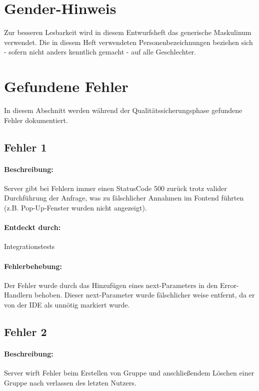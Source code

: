 \documentclass{qualitätssicherungsheft}
\begin{document}

\maketitle
\tableofcontents
\newpage

\section*{Gender-Hinweis}
Zur besseren Lesbarkeit wird in diesem Entwurfsheft das generische Maskulinum verwendet.
Die in diesem Heft verwendeten Personenbezeichnungen beziehen sich - sofern nicht anders kenntlich gemacht - auf alle Geschlechter.
\newpage

\section{Gefundene Fehler}
In diesem Abschnitt werden während der Qualitätssicherungsphase gefundene Fehler dokumentiert.

\subsection{Fehler 1}
\paragraph*{Beschreibung:} Server gibt bei Fehlern immer einen StatusCode 500 zurück trotz valider Durchführung der Anfrage, was zu fälschlicher Annahmen im Fontend führten (z.B. Pop-Up-Fenster wurden nicht angezeigt). 
\paragraph*{Entdeckt durch:} Integrationstests
\paragraph*{Fehlerbehebung:} Der Fehler wurde durch das Hinzufügen eines
next-Parameters in den Error-Handlern behoben. Dieser next-Parameter wurde fälschlicher weise entfernt, da er von der IDE als unnötig markiert wurde. 

\subsection{Fehler 2}
\paragraph*{Beschreibung:} Server wirft Fehler beim Erstellen von Gruppe und anschließendem Löschen einer Gruppe nach verlassen des letzten Nutzers.
\end{document}
